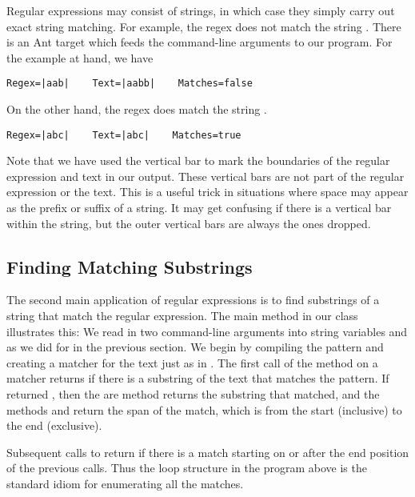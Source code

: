 Regular expressions may consist of strings, in which case they
simply carry out exact string matching.  For example, the regex
 does not match the string .  
There is an Ant target  which feeds the command-line
arguments to our program.  For the example at hand, we have
%
\begin{verbatim}
Regex=|aab|    Text=|aabb|    Matches=false
\end{verbatim}
%
On the other hand, the regex  does match
the string .
%
\begin{verbatim}
Regex=|abc|    Text=|abc|    Matches=true
\end{verbatim}
%
Note that we have used the vertical bar to mark the boundaries of the
regular expression and text in our output.  These vertical bars are
not part of the regular expression or the text.  This is a useful
trick in situations where space may appear as the prefix or suffix of
a string.  It may get confusing if there is a vertical bar within the
string, but the outer vertical bars are always the ones dropped.

\subsection{Finding Matching Substrings}\label{section:regex-find}

The second main application of regular expressions is to find
substrings of a string that match the regular expression.  The main
method in our class  illustrates this:
%
%
We read in two
command-line arguments into string variables  and 
as we did for  in the previous section.  We begin
by compiling the pattern and creating a matcher for the text just
as in .
%
%
The first call of the  method on a matcher returns
 if there is a substring of the text that matches the
pattern.  If  returned , then the are method
 returns the substring that matched, and the methods
 and  return the span of the match, which is
from the start (inclusive) to the end (exclusive).

Subsequent calls to  return  if there is a
match starting on or after the end position of the previous calls.
Thus the loop structure in the program above is the standard idiom
for enumerating all the matches.  

